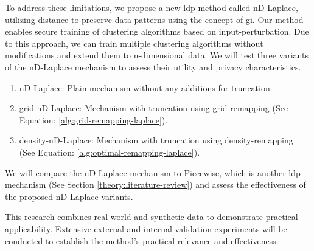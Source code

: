 To address these limitations, we propose a new \gls{ldp} method called nD-Laplace, utilizing distance to preserve data patterns using the concept of \gls{gi}. \newline
Our method enables secure training of clustering algorithms based on input-perturbation.
Due to this approach, we can train multiple clustering algorithms without modifications and extend them to n-dimensional data.
We will test three variants of the nD-Laplace mechanism to assess their utility and privacy characteristics.
\begin{enumerate}
    \item nD-Laplace: Plain mechanism without any additions for truncation.
    \item grid-nD-Laplace: Mechanism with truncation using grid-remapping (See Equation: \ref{alg:grid-remapping-laplace}).
    \item density-nD-Laplace: Mechanism with truncation using density-remapping (See Equation: \ref{alg:optimal-remapping-laplace}).
\end{enumerate}
We will compare the nD-Laplace mechanism to Piecewise, which is another \gls{ldp} mechanism (See Section \ref{theory:literature-review}) and assess the effectiveness of the proposed nD-Laplace variants.

This research combines real-world and synthetic data to demonstrate practical applicability.
Extensive external and internal validation experiments will be conducted to establish the method's practical relevance and effectiveness.


